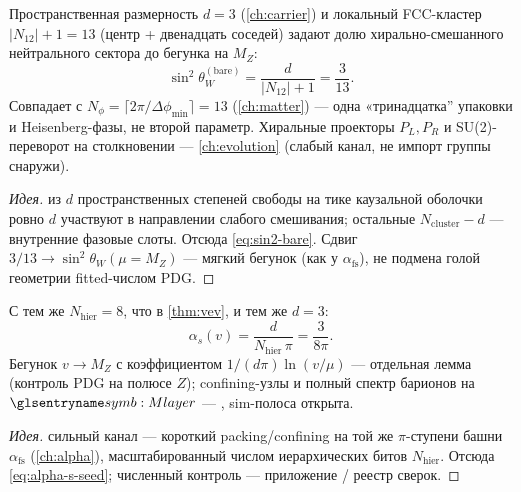 \begin{proposition}
\label{prop:weinberg-bare}
Пространственная размерность $d=3$ (\cref{ch:carrier}) и локальный FCC-кластер
$|N_{12}|+1=13$ (центр + двенадцать соседей) задают долю хирально-смешанного
нейтрального сектора до бегунка на $M_Z$:
\begin{equation}
\label{eq:sin2-bare}
  \sin^2\theta_W^{(\mathrm{bare})}
  = \frac{d}{|N_{12}|+1}
  = \frac{3}{13}.
\end{equation}
Совпадает с $N_\phi=\lceil 2\pi/\Delta\phi_{\min}\rceil=13$ (\cref{ch:matter}) ---
одна «тринадцатка'' упаковки и Heisenberg-фазы, не второй параметр.
Хиральные проекторы $P_L,P_R$ и SU(2)-переворот на столкновении --- \cref{ch:evolution}
(слабый канал, не импорт группы снаружи).
\end{proposition}

\begin{proof}[Идея]
из $d$ пространственных степеней свободы на тике каузальной оболочки ровно $d$ участвуют
в направлении слабого смешивания; остальные $N_{\mathrm{cluster}}-d$ --- внутренние фазовые слоты.
Отсюда \eqref{eq:sin2-bare}.
Сдвиг $3/13\to\sin^2\theta_W(\mu=M_Z)$ --- мягкий бегунок (как у $\alpha_{\mathrm{fs}}$),
не подмена голой геометрии fitted-числом PDG.
\end{proof}

\begin{proposition}
\label{prop:alpha-s-seed}
С тем же $N_{\mathrm{hier}}=8$, что в \cref{thm:vev}, и тем же $d=3$:
\begin{equation}
\label{eq:alpha-s-seed}
  \alpha_s(v)=\frac{d}{N_{\mathrm{hier}}\,\pi}=\frac{3}{8\pi}.
\end{equation}
Бегунок $v\to M_Z$ с коэффициентом $1/(d\pi)\ln(v/\mu)$ --- отдельная лемма
(контроль PDG на полюсе $Z$); confining-узлы и полный спектр барионов на~$\Mlayer$ ---
, sim-полоса открыта.
\end{proposition}

\begin{proof}[Идея]
сильный канал --- короткий packing/confining на той же $\pi$-ступени башни $\alpha_{\mathrm{fs}}$
(\cref{ch:alpha}), масштабированный числом иерархических битов $N_{\mathrm{hier}}$.
Отсюда \eqref{eq:alpha-s-seed}; численный контроль --- приложение / реестр сверок.
\end{proof}

